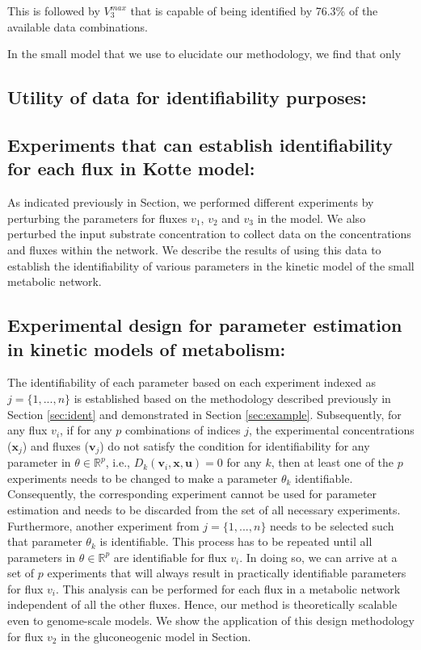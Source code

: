 \documentclass[10pt]{article}
\begin{document}
{This is followed by $V_3^{max}$ that is capable of being identified by 76.3\% of the available data combinations. 

In the small model that we use to elucidate our methodology, we find that only 



\subsection{Utility of data for identifiability purposes:}

\subsection{Experiments that can establish identifiability for each flux in Kotte model:}	
As indicated previously in Section, we performed different experiments by perturbing the parameters for fluxes $v_1$, $v_2$ and $v_3$ in the model. We also perturbed the input substrate concentration to collect data on the concentrations and fluxes within the network. We describe the results of using this data to establish the identifiability of various parameters in the kinetic model of the small metabolic network.



\subsection{Experimental design for parameter estimation in kinetic models of metabolism:}
The identifiability of each parameter based on each experiment indexed as $j = \{1, ..., n\}$ is established based on the methodology described previously in Section \ref{sec:ident} and demonstrated in Section \ref{sec:example}. Subsequently, for any flux $v_i$, if for any $p$ combinations of indices $j$, the experimental concentrations ($\mathbf{x}_j$) and fluxes ($\mathbf{v}_j$) do not satisfy the condition for identifiability for any parameter in $\theta\in\mathbb{R}^p$, i.e., $D_k(\mathbf{v}_i, \mathbf{x}, \mathbf{u}) = 0$ for any $k$, then at least one of the $p$ experiments needs to be changed to make a parameter $\theta_k$ identifiable. Consequently, the corresponding experiment cannot be used for parameter estimation and needs to be discarded from the set of all necessary experiments. Furthermore, another experiment from $j = \{1, ..., n\}$ needs to be selected such that parameter $\theta_k$ is identifiable. This process has to be repeated until all parameters in $\theta\in\mathbb{R}^p$ are identifiable for flux $v_i$. In doing so, we can arrive at a set of $p$ experiments that will always result in practically identifiable parameters for flux $v_i$. This analysis can be performed for each flux in a metabolic network independent of all the other fluxes. Hence, our method is theoretically scalable even to genome-scale models. We show the application of this design methodology for flux $v_2$ in the gluconeogenic model in Section.

}
\end{document}
